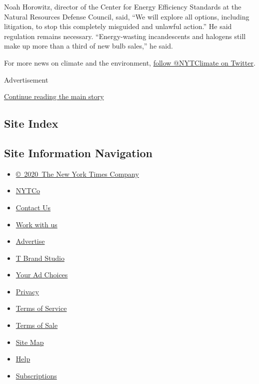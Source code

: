 Noah Horowitz, director of the Center for Energy Efficiency Standards at
the Natural Resources Defense Council, said, ``We will explore all
options, including litigation, to stop this completely misguided and
unlawful action.'' He said regulation remains necessary.
``Energy-wasting incandescents and halogens still make up more than a
third of new bulb sales,'' he said.

For more news on climate and the environment,
\href{https://twitter.com/nytclimate}{follow @NYTClimate on Twitter}.

Advertisement

\protect\hyperlink{after-bottom}{Continue reading the main story}

\hypertarget{site-index}{%
\subsection{Site Index}\label{site-index}}

\hypertarget{site-information-navigation}{%
\subsection{Site Information
Navigation}\label{site-information-navigation}}

\begin{itemize}
\tightlist
\item
  \href{https://help.nytimes3xbfgragh.onion/hc/en-us/articles/115014792127-Copyright-notice}{©~2020~The
  New York Times Company}
\end{itemize}

\begin{itemize}
\tightlist
\item
  \href{https://www.nytco.com/}{NYTCo}
\item
  \href{https://help.nytimes3xbfgragh.onion/hc/en-us/articles/115015385887-Contact-Us}{Contact
  Us}
\item
  \href{https://www.nytco.com/careers/}{Work with us}
\item
  \href{https://nytmediakit.com/}{Advertise}
\item
  \href{http://www.tbrandstudio.com/}{T Brand Studio}
\item
  \href{https://www.nytimes3xbfgragh.onion/privacy/cookie-policy\#how-do-i-manage-trackers}{Your
  Ad Choices}
\item
  \href{https://www.nytimes3xbfgragh.onion/privacy}{Privacy}
\item
  \href{https://help.nytimes3xbfgragh.onion/hc/en-us/articles/115014893428-Terms-of-service}{Terms
  of Service}
\item
  \href{https://help.nytimes3xbfgragh.onion/hc/en-us/articles/115014893968-Terms-of-sale}{Terms
  of Sale}
\item
  \href{https://spiderbites.nytimes3xbfgragh.onion}{Site Map}
\item
  \href{https://help.nytimes3xbfgragh.onion/hc/en-us}{Help}
\item
  \href{https://www.nytimes3xbfgragh.onion/subscription?campaignId=37WXW}{Subscriptions}
\end{itemize}
